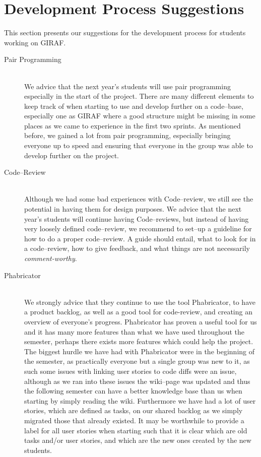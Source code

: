 \section{Development Process Suggestions}
This section presents our suggestions for the development process for students working on GIRAF.

\begin{description}
	\item[Pair Programming] \hfill \\
	We advice that the next year's students will use pair programming especially in the start of the project.
    There are many different elements to keep track of when starting to use and develop further on a code--base, especially one as GIRAF where a good structure might be missing in some places as we came to experience in the first two sprints.
	As mentioned before, we gained a lot from pair programming, especially bringing everyone up to speed and ensuring that everyone in the group was able to develop further on the project.

	\item[Code--Review] \hfill \\
	Although we had some bad experiences with Code--review, we still see the potential in having them for design purposes.
	We advice that the next year's students will continue having Code--reviews, but instead of having very loosely defined code--review, we recommend to set--up a guideline for how to do a proper code--review.
	A guide should entail, what to look for in a code--review, how to give feedback, and what things are not necessarily \textit{comment-worthy}.

	\item[Phabricator] \hfill \\
	We strongly advice that they continue to use the tool Phabricator, to have a product backlog, as well as a good tool for code-review, and creating an overview of everyone's progress.
	Phabricator has proven a useful tool for us and it has many more features than what we have used throughout the semester, perhaps there exists more features which could help the project.
	The biggest hurdle we have had with Phabricator were in the beginning of the semester, as practically everyone but a single group was new to it, as such some issues with linking user stories to code diffs were an issue, although as we ran into these issues the wiki--page was updated and thus the following semester can have a better knowledge base than us when starting by simply reading the wiki.
	Furthermore we have had a lot of user stories, which are defined as tasks, on our shared backlog as we simply migrated those that already existed.
	It may be worthwhile to provide a label for all user stories when starting such that it is clear which are old tasks and/or user stories, and which are the new ones created by the new students.


\end{description}
